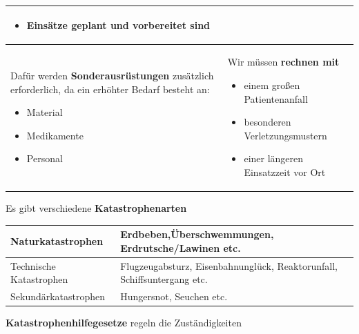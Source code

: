 \documentclass{article}
\newcommand\gEs[1]{\textbf{\textcolor[rgb]{0.0,0.0,0.5019608}{#1}}}
\newcommand\gEs[1]{\textbf{\textcolor[rgb]{0.0,0.0,0.5019608}{#1}}}
\newcommand\gNw[1]{#1}
\begin{document}
\begin{center}
\begin{supertabular}{|m{6.649cm}|m{6.651cm}|}
\begin{itemize}
\item {\mdseries Eins\"atze geplant und vorbereitet sind}

\end{itemize}
\\\hline
{\mdseries Daf\"ur werden \gEs{Sonderausr\"ustungen}
zus\"atzlich erforderlich, da ein erh\"ohter Bedarf besteht an:}

\begin{itemize}
\item {\mdseries Material}

\item {\mdseries Medikamente}

\item {\mdseries Personal}

\end{itemize}
 &
{\mdseries Wir m\"ussen \gEs{rechnen mit}}

\begin{itemize}
\item {\mdseries einem gro{\ss}en Patientenanfall}

\item {\mdseries besonderen Verletzungsmustern}

\item {\mdseries einer l\"angeren Einsatzzeit vor Ort}

\end{itemize}
\\\hline
\end{supertabular}
\end{center}
{\mdseries\color{black}
\gNw{Es gibt verschiedene
}\gEs{Katastrophenarten}}

\begin{center}
\tablehead{}\begin{supertabular}{|m{6.649cm}|m{6.651cm}|}
\hline
{\mdseries\color{black} Naturkatastrophen}

 &
{\mdseries Erdbeben,\"Uberschwemmungen, Erdrutsche/Lawinen etc.}

\\\hline
{\mdseries\color{black} Technische Katastrophen}

 &
{\mdseries Flugzeugabsturz, Eisenbahnungl\"uck, Reaktor\-unfall,
Schiffs\-untergang etc.}

\\\hline
{\mdseries\color{black} Sekund\"arkatastrophen}

 &
{\mdseries Hungersnot, Seuchen etc.}

\\\hline
\end{supertabular}
\end{center}
{\mdseries\color{black}
\gEs{Katastrophenhilfegesetze} regeln die
Zust\"andigkeiten}
\end{document}
